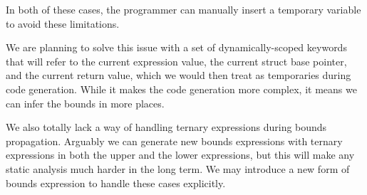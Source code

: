 In both of these cases, the programmer can manually insert a temporary
variable to avoid these limitations.

We are planning to solve this issue with a set of dynamically-scoped
keywords that will refer to the current expression value, the current
struct base pointer, and the current return value, which we would then
treat as temporaries during code generation. While it makes the code
generation more complex, it means we can infer the bounds in more
places.

We also totally lack a way of handling ternary expressions during
bounds propagation. Arguably we can generate new bounds expressions
with ternary expressions in both the upper and the lower expressions,
but this will make any static analysis much harder in the long term.
We may introduce a new form of bounds expression to handle these cases
explicitly.



